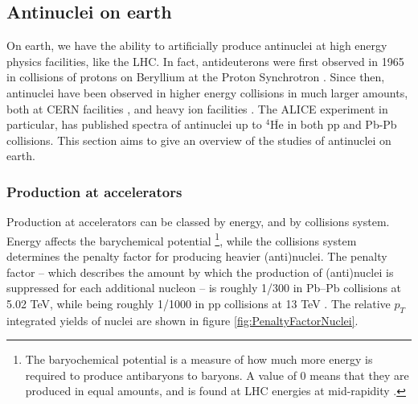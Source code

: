 \subsection{Antinuclei on earth}
On earth, we have the ability to artificially produce antinuclei at high energy physics facilities, like the LHC. In fact, antideuterons were first observed in 1965 in collisions of protons on Beryllium at the Proton Synchrotron \cite{Massam:345976}. Since then, antinuclei have been observed in higher energy collisions in much larger amounts, both at CERN facilities \cite{nuclei_pp_13TeV, nuclei_pp_5TeV, nuclei_pp_PbPb, nuclei_pp}, and heavy ion facilities \cite{Ma_2013}. The ALICE experiment in particular, has published spectra of antinuclei up to $^4\overline{\mathrm{He}}$ \cite{nuclei_pp_13TeV, nuclei_pp_5TeV, nuclei_pp_PbPb, nuclei_pp} in both pp and Pb-Pb collisions. This section aims to give an overview of the studies of antinuclei on earth. 
\subsubsection{Production at accelerators}
Production at accelerators can be classed by energy, and by collisions system. Energy affects the barychemical potential \footnote{The baryochemical potential is a measure of how much more energy is required to produce antibaryons to baryons. A value of 0 means that they are produced in equal amounts, and is found at LHC energies at mid-rapidity \cite{primordial_ratio1, primordial_ratio2}.}, while the collisions system determines the penalty factor for producing heavier (anti)nuclei. The penalty factor -- which describes the amount by which the production of (anti)nuclei is suppressed for each additional nucleon -- is roughly 1/300 in Pb--Pb collisions at 5.02 TeV, while being roughly 1/1000 in pp collisions at 13 TeV \cite{antinuclei_mult_dependence}. The relative $p_T$ integrated yields of nuclei are shown in figure \ref{fig:PenaltyFactorNuclei}. \\

